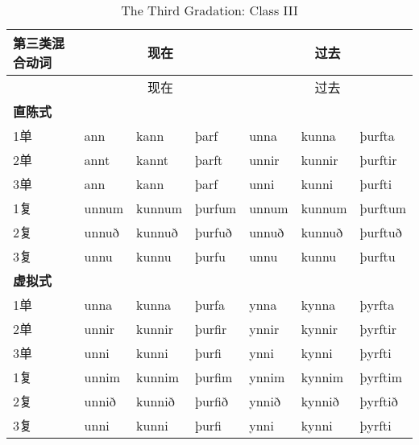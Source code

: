 \begin{longtable}{lllllll}
  \caption[The Third Gradation: Class III]{The Third Gradation: Class
    III}\tabularnewline
  \toprule
  第三类混合动词  & \multicolumn{3}{c}{现在} & \multicolumn{3}{c}{过去}                                         \\\midrule\endfirsthead{} &\multicolumn{3}{c}{现在} &\multicolumn{3}{c}{过去} \\
  \midrule
  \endhead
  \bottomrule
  \endfoot
  \textbf{直陈式} & ~                        & ~                        & ~        & ~       & ~      & ~       \\
  1单             & ann                      & kann                     & þarf     & unna    & kunna  & þurfta  \\
  2单             & annt                     & kannt                    & þarft    & unnir   & kunnir & þurftir \\
  3单             & ann                      & kann                     & þarf     & unni    & kunni  & þurfti  \\
  1复             & unnum                    & kunnum                   & þurfum   & unnum   & kunnum & þurftum \\
  2复             & unnuð                    & kunnuð                   & þurfuð   & unnuð   & kunnuð & þurftuð \\
  3复             & unnu                     & kunnu                    & þurfu    & unnu    & kunnu  & þurftu  \\
  \textbf{虚拟式} & ~                        & ~                        & ~        & ~       & ~      & ~       \\
  1单             & unna                     & kunna                    & þurfa    & ynna    & kynna  & þyrfta  \\
  2单             & unnir                    & kunnir                   & þurfir   & ynnir   & kynnir & þyrftir \\
  3单             & unni                     & kunni                    & þurfi    & ynni    & kynni  & þyrfti  \\
  1复             & unnim                    & kunnim                   & þurfim   & ynnim   & kynnim & þyrftim \\
  2复             & unnið                    & kunnið                   & þurfið   & ynnið   & kynnið & þyrftið \\
  3复             & unni                     & kunni                    & þurfi    & ynni    & kynni  & þyrfti  \\

\end{longtable}
